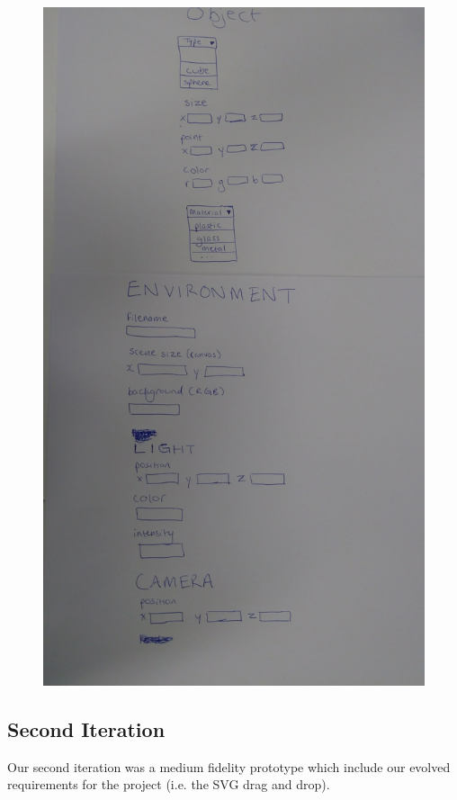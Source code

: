 \documentclass[a4paper]{report}
\begin{document}
	\begin{figure}[h]
		\includegraphics[width=1\textwidth]{First_Iteration_Prototype.jpg}
	\end{figure}
	
	\subsection{Second Iteration}
	
	Our second iteration was a medium fidelity prototype which include our evolved requirements for the project (i.e. the SVG drag and drop).
	
\end{document}
